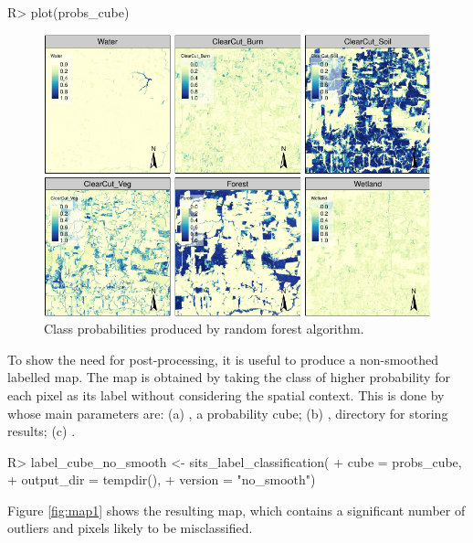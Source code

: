 \documentclass[
]{jss}
\begin{document}
\begin{CodeChunk}
\begin{CodeInput}
R> plot(probs_cube)
\end{CodeInput}
\begin{figure}[h]

{\centering \includegraphics{Bayesian_smoothing_JSS_files/figure-latex/pcube-1} 

}

\caption[Class probabilities produced by random forest algorithm]{Class probabilities produced by random forest algorithm.}\label{fig:pcube}
\end{figure}
\end{CodeChunk}

To show the need for post-processing, it is useful to produce a non-smoothed labelled map. The map is obtained by taking the class of higher probability for each pixel as its label without considering the spatial context. This is done by  whose main parameters are: (a) , a probability cube; (b) , directory for storing results; (c) .

\begin{CodeChunk}
\begin{CodeInput}
R> label_cube_no_smooth <- sits_label_classification(
+     cube = probs_cube,
+     output_dir = tempdir(),
+     version = "no_smooth")
\end{CodeInput}
\end{CodeChunk}

Figure \ref{fig:map1} shows the resulting map, which contains a significant number of outliers and pixels likely to be misclassified.
\end{document}
